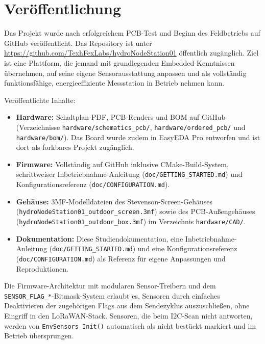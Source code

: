 \section*{Veröffentlichung}

Das Projekt wurde nach erfolgreichem PCB-Test und Beginn des Feldbetriebs auf GitHub veröffentlicht. Das Repository ist unter \url{https://github.com/TexhFexLabs/hydroNodeStation01} öffentlich zugänglich. Ziel ist eine Plattform, die jemand mit grundlegenden Embedded-Kenntnissen übernehmen, auf seine eigene Sensorausstattung anpassen und als vollständig funktionsfähige, energieeffiziente Messstation in Betrieb nehmen kann.

Veröffentlichte Inhalte:

\begin{itemize}
  \item \textbf{Hardware:} Schaltplan-PDF, PCB-Renders und BOM auf GitHub (Verzeichnisse \texttt{hardware/schematics\_pcb/}, \texttt{hardware/ordered\_pcb/} und \texttt{hardware/bom/}). Das Board wurde zudem in EasyEDA Pro entworfen und ist dort als forkbares Projekt zugänglich.

  \item \textbf{Firmware:} Vollständig auf GitHub inklusive CMake-Build-System, schrittweiser Inbetriebnahme-Anleitung (\texttt{doc/GETTING\_STARTED.md}) und Konfigurationsreferenz (\texttt{doc/CONFIGURATION.md}).

  \item \textbf{Gehäuse:} 3MF-Modelldateien des Stevenson-Screen-Gehäuses (\texttt{hydroNodeStation01\_outdoor\_screen.3mf}) sowie des PCB-Außengehäuses (\texttt{hydroNodeStation01\_outdoor\_box.3mf}) im Verzeichnis \texttt{hardware/CAD/}.

  \item \textbf{Dokumentation:} Diese Studiendokumentation, eine Inbetriebnahme-Anleitung (\texttt{doc/GETTING\_STARTED.md}) und eine Konfigurationsreferenz (\texttt{doc/CONFIGURATION.md}) als Referenz für eigene Anpassungen und Reproduktionen.
\end{itemize}

Die Firmware-Architektur mit modularen Sensor-Treibern und dem \texttt{SENSOR\_FLAG\_*}-Bitmask-System erlaubt es, Sensoren durch einfaches Deaktivieren der zugehörigen Flags aus dem Sendezyklus auszuschließen, ohne Eingriff in den LoRaWAN-Stack. Sensoren, die beim I2C-Scan nicht antworten, werden von \texttt{EnvSensors\_Init()} automatisch als nicht bestückt markiert und im Betrieb übersprungen.
